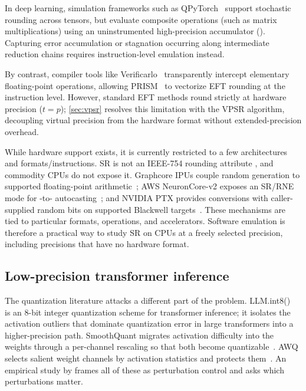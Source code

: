 In deep learning, simulation frameworks such as
QPyTorch~\citep{zhang2019qpytorch} support stochastic rounding across tensors,
but evaluate composite operations (such as matrix multiplications) using an
uninstrumented high-precision accumulator (). Capturing error
accumulation or stagnation occurring along intermediate reduction chains
requires instruction-level emulation instead.

By contrast, compiler tools like Verificarlo~\citep{denis2016verificarlo}
transparently intercept elementary floating-point operations, allowing
PRISM~\citep{prism} to vectorize EFT rounding at the instruction level.
However, standard EFT methods round strictly at hardware precision ($t = p$);
\cref{sec:vpsr} resolves this limitation with the VPSR algorithm, decoupling
virtual precision from the hardware format without extended-precision overhead.

While hardware support exists, it is currently restricted to a few architectures
and formats/instructions. SR is not an IEEE-754 rounding attribute
\citep{ieee754-2019}, and commodity CPUs do not expose it. Graphcore IPUs couple
random generation to supported floating-point
arithmetic~\citep{graphcore2020aifloat}; AWS NeuronCore-v2 exposes an SR/RNE mode
for -to- autocasting~\citep{aws2023neuroncore}; and NVIDIA
PTX provides  conversions with caller-supplied random bits on
supported Blackwell targets~\citep{nvidia2025ptx}. These mechanisms are tied to
particular formats, operations, and accelerators. Software emulation is
therefore a practical way to study SR on CPUs at a freely selected precision,
including precisions that have no hardware format.

\subsection{Low-precision transformer inference}

The quantization literature attacks a different part of the problem.
LLM.int8()~\citep{3600270.3602468} is an 8-bit integer quantization scheme for
transformer inference; it isolates the activation outliers that dominate
quantization error in large transformers into a higher-precision path.
SmoothQuant migrates activation difficulty into the
weights through a per-channel rescaling so that both become
quantizable~\citep{xiao2023smoothquant}. AWQ selects salient weight channels by
activation statistics and protects them~\citep{lin2024awq}. An empirical study by
\citet{gong2024what} frames all of these as perturbation control and asks which
perturbations matter.

